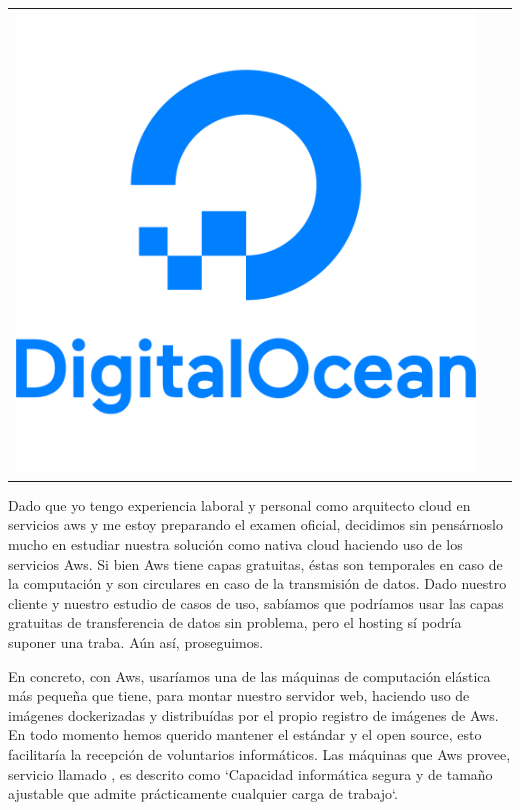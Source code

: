 \begin{table}[h]
\begin{tabular}{ccc}
\includegraphics[scale=0.08]{archivos/digitalocean.png}
\end{tabular}
\end{table}
\vspace{1em}
\par Dado que yo tengo experiencia laboral y personal como arquitecto cloud en servicios aws y me estoy preparando el examen oficial, decidimos sin pensárnoslo mucho en estudiar nuestra solución como nativa cloud haciendo uso de los servicios Aws. Si bien Aws tiene capas gratuitas, éstas son temporales en caso de la computación y son circulares en caso de la transmisión de datos. Dado nuestro cliente y nuestro estudio de casos de uso, sabíamos que podríamos usar las capas gratuitas de transferencia de datos sin problema, pero el hosting sí podría suponer una traba. Aún así, proseguimos.
\vspace{1em}
\par En concreto, con Aws, usaríamos una de las máquinas de computación elástica más pequeña que tiene, para montar nuestro servidor web, haciendo uso de imágenes dockerizadas y distribuídas por el propio registro de imágenes de Aws. En todo momento hemos querido mantener el estándar y el open source, esto facilitaría la recepción de voluntarios informáticos. Las máquinas que Aws provee, servicio llamado \citep{ec2AWS}, es descrito como `Capacidad informática segura y de tamaño ajustable que admite prácticamente cualquier carga de trabajo`.
